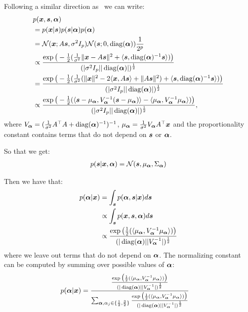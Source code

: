 Following a similar direction as~\cite{moulines1997maximum} we can write:
\begin{align}
  &p(\boldsymbol{x}, \boldsymbol{s}, \boldsymbol{\alpha}) \\
  &= p(\boldsymbol{x} | \boldsymbol{s}) p(\boldsymbol{s}|\boldsymbol{\alpha})p(\boldsymbol{\alpha}) \\
                        &= \mathcal{N}(\boldsymbol{x}; A\boldsymbol{s}, \sigma^2 I_p)\mathcal{N}( \boldsymbol{s}; 0, \operatorname*{diag}(\boldsymbol{\alpha})) \frac1{2^p} \\
  &\propto \frac{\exp\big(-\frac12(\frac1{ \sigma^2}\|\boldsymbol{x} - A\boldsymbol{s} \|^2 + \langle \boldsymbol{s} , \operatorname*{diag}(\boldsymbol{\alpha})^{-1} \boldsymbol{s}\rangle)\big)}{(|\sigma^2 I_p| |\operatorname*{diag}(\boldsymbol{\alpha})|)^{\frac12}}  \\
  &= \frac{\exp\big(-\frac12(\frac1{ \sigma^2}(\|\boldsymbol{x} \|^2 - 2 \langle \boldsymbol{x}, A \boldsymbol{s} \rangle + \|A \boldsymbol{s} \|^2)  + \langle \boldsymbol{s} , \operatorname*{diag}(\boldsymbol{\alpha})^{-1} \boldsymbol{s}\rangle) \big)}{(|\sigma^2 I_p| |\operatorname*{diag}(\boldsymbol{\alpha})|)^{\frac12}} \\
  &\propto \frac{\exp\big(-\frac12( \langle \boldsymbol{s} - \mu_{\boldsymbol{\alpha}}, V_{\boldsymbol{\alpha}}^{-1} (\boldsymbol{s} - \mu_{\boldsymbol{\alpha}}) \rangle - \langle \mu_{\boldsymbol{\alpha}} ,V_{\boldsymbol{\alpha}}^{-1} \mu_{\boldsymbol{\alpha}} \rangle) \big)}{(|\sigma^2 I_p| |\operatorname*{diag}(\boldsymbol{\alpha})|)^{\frac12}},
\end{align}
where $V_{\boldsymbol{\alpha}} = (\frac1{\sigma^2}A^{\top}A + \operatorname*{diag}(\boldsymbol{\alpha})^{-1})^{-1}$, $\mu_{\boldsymbol{\alpha}} = \frac1{\sigma^2}V_{\boldsymbol{\alpha}}
A^{\top} \boldsymbol{x}$ and the proportionality constant contains terms that do not depend
on $\boldsymbol{s}$ or $\boldsymbol{\alpha}$.

So that we get:
\begin{align}
  p(\boldsymbol{s} | \boldsymbol{x}, \boldsymbol{\alpha}) =  \mathcal{N}(\boldsymbol{s}, \mu_{\boldsymbol{\alpha}}, \Sigma_{\boldsymbol{\alpha}})
\end{align}

Then we have that:
\begin{align}
  p(\boldsymbol{\alpha} | \boldsymbol{x}) &= \int_{\boldsymbol{s}} p(\boldsymbol{\alpha}, \boldsymbol{s} | \boldsymbol{x}) d\boldsymbol{s} \\
                    &\propto \int_{\boldsymbol{s}} p(\boldsymbol{x}, \boldsymbol{s} ,\boldsymbol{\alpha}) d\boldsymbol{s} \\ 
                   &\propto \frac{\exp\big(\frac12(\langle \mu_{\boldsymbol{\alpha}} ,V_{\boldsymbol{\alpha}}^{-1} \mu_{\boldsymbol{\alpha}} \rangle) \big)}{(|\operatorname*{diag}(\boldsymbol{\alpha})| |V_{\boldsymbol{\alpha}}^{-1}|)^{\frac12}}\\ 
\end{align}
where we leave out terms that do not depend on $\boldsymbol{\alpha}$.
The normalizing constant can be computed by summing over possible values of
$\boldsymbol{\alpha}$:
\begin{align}
  p(\boldsymbol{\alpha} | \boldsymbol{x}) &= \frac{\frac{\exp\big(\frac12(\langle \mu_{\boldsymbol{\alpha}} ,V_{\boldsymbol{\alpha}}^{-1} \mu_{\boldsymbol{\alpha}} \rangle) \big)}{(|\operatorname*{diag}(\boldsymbol{\alpha})| |V_{\boldsymbol{\alpha}}^{-1}|)^{\frac12}}}{\sum_{\boldsymbol{\alpha}, \alpha_j \in \{\frac12, \frac32\}} \frac{\exp\big(\frac12(\langle \mu_{\boldsymbol{\alpha}} ,V_{\boldsymbol{\alpha}}^{-1} \mu_{\boldsymbol{\alpha}} \rangle) \big)}{(|\operatorname*{diag}(\boldsymbol{\alpha})| |V_{\boldsymbol{\alpha}}^{-1}|)^{\frac12}}}
\end{align}

